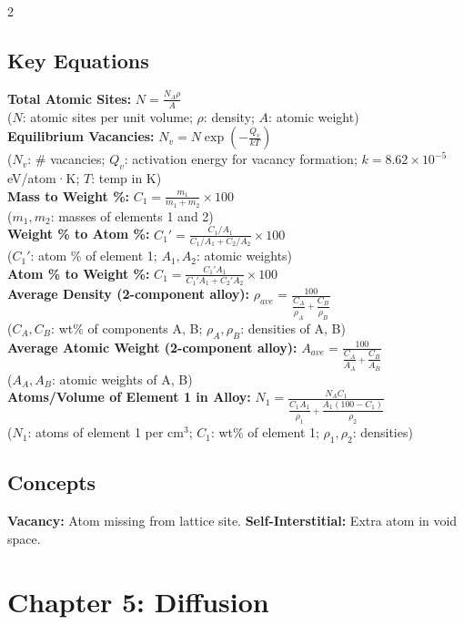 \documentclass[8pt]{extarticle}
\begin{document}
\begin{multicols*}{2}
\subsection*{Key Equations}
\textbf{Total Atomic Sites:} $N = \frac{N_A \rho}{A}$ \\
($N$: atomic sites per unit volume; $\rho$: density; $A$: atomic weight) \\
\textbf{Equilibrium Vacancies:} $N_v = N\exp\!\left(-\frac{Q_v}{kT}\right)$ \\
($N_v$: \# vacancies; $Q_v$: activation energy for vacancy formation; $k=8.62\times10^{-5}$ eV/atom·K; $T$: temp in K) \\
\textbf{Mass to Weight \%:} $C_1 = \frac{m_1}{m_1+m_2}\times100$ \\
($m_1, m_2$: masses of elements 1 and 2) \\
\textbf{Weight \% to Atom \%:} $C_1' = \frac{C_1/A_1}{C_1/A_1+C_2/A_2}\times100$ \\
($C_1'$: atom \% of element 1; $A_1,A_2$: atomic weights) \\
\textbf{Atom \% to Weight \%:} $C_1 = \frac{C_1'A_1}{C_1'A_1+C_2'A_2}\times100$ \\
\textbf{Average Density (2-component alloy):} $\rho_{ave} = \frac{100}{\dfrac{C_A}{\rho_A}+\dfrac{C_B}{\rho_B}}$ \\
($C_A, C_B$: wt\% of components A, B; $\rho_A,\rho_B$: densities of A, B) \\
\textbf{Average Atomic Weight (2-component alloy):} $A_{ave} = \frac{100}{\dfrac{C_A}{A_A}+\dfrac{C_B}{A_B}}$ \\
($A_A, A_B$: atomic weights of A, B) \\
\textbf{Atoms/Volume of Element 1 in Alloy:} $N_1 = \frac{N_A C_1}{\dfrac{C_1 A_1}{\rho_1}+\dfrac{A_1(100-C_1)}{\rho_2}}$ \\
($N_1$: atoms of element 1 per cm$^3$; $C_1$: wt\% of element 1; $\rho_1,\rho_2$: densities)
\subsection*{Concepts}
\textbf{Vacancy:} Atom missing from lattice site. \textbf{Self-Interstitial:} Extra atom in void space.

\section*{Chapter 5: Diffusion}

\end{multicols*}
\end{document}
